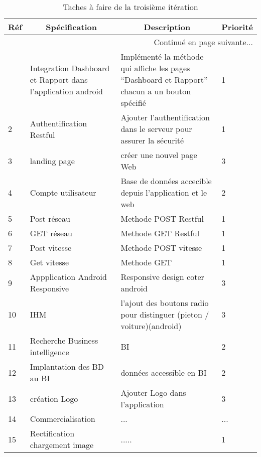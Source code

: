 \begin{center}
    \footnotesize
    \begin{longtable}{| p{1cm} | p{5cm} | p{7cm} | p{1cm} |}
        \caption{Taches à faire de la troisième itération}
        \label{tab:sprint3-backlog} \\

 \hline
 \multicolumn{1}{|c}{\textbf{Réf}} &
 \multicolumn{1}{|c}{\textbf{Spécification}} &
 \multicolumn{1}{|c}{\textbf{Description}} &
 \multicolumn{1}{|c|}{\textbf{Priorité}} \\ \hline
 \endhead

 \hline \multicolumn{4}{|r|}{{Continué en page suivante$\dotsc$}} \\ \hline
 \endfoot

 \hline \hline
 \endlastfoot

\hline
1 & Integration Dashboard et Rapport dans l'application android & Implémenté la méthode qui affiche les pages ``Dashboard et Rapport'' chacun a un bouton spécifié   & 1 \\ \hline
2 & Authentification Restful  & Ajouter l'authentification dans le serveur pour assurer la sécurité   & 1 \\ \hline
3 & landing page & créer une nouvel page Web  & 3\\ \hline
4 & Compte utilisateur & Base de données accecible depuis l'application et le web& 2 \\ \hline
5 & Post réseau & Methode POST Restful & 1 \\ \hline
6 & GET réseau & Methode GET Restful & 1 \\ \hline
7 & Post vitesse & Methode POST vitesse & 1 \\ \hline
8 & Get vitesse & Methode GET & 1 \\ \hline
9 & Appplication Android Responsive & Responsive design coter android & 3 \\ \hline
10 & IHM & l'ajout des boutons radio pour distinguer (pieton / voiture)(android) & 3 \\ \hline
11 & Recherche Business intelligence & BI & 2 \\ \hline
12 & Implantation des BD au BI & données accessible en BI & 2\\ \hline
13 & création Logo &Ajouter Logo dans l'application & 3 \\ \hline
14 & Commercialisation & ...& ...\\ \hline
15 & Rectification chargement image &..... & 1 \\ \hline



\end{longtable}
\end{center}


